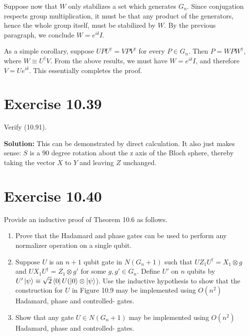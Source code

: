 \documentclass{book}
\begin{document}
    Suppose now that $W$ only stabilizes a set which generates $G_n$. Since conjugation respects group multiplication, it must be that any product of the generators, hence the whole group itself, must be stabilized by $W$. By the previous paragraph, we conclude $W = e^{i\delta} I $.
    
    As a simple corollary, suppose $U P U^\dagger = V P V^\dagger$ for every $P\in G_n$. Then $P = W P W^\dagger$, where $W \equiv U^\dagger V$. From the above results, we must have $W = e^{i\delta}I$, and therefore $V = U e^{i\delta}$. This essentially completes the proof.
    
\section*{Exercise 10.39}
    Verify (10.91).
    
    \textbf{Solution:} This can be demonstrated by direct calculation. It also just makes sense: $S$ is a 90 degree rotation about the z axis of the Bloch sphere, thereby taking the vector $X$ to $Y$ and leaving $Z$ unchanged. 
    
\section*{Exercise 10.40}
    Provide an inductive proof of Theorem 10.6 as follows.
    \begin{enumerate}
        \item Prove that the Hadamard and phase gates can be used to perform any normalizer operation on a single qubit.
    
        \item Suppose $U$ is an $n+1$ qubit gate in $N(G_n+1)$ such that $U Z_1 U^\dagger = X_1 \otimes g$ and $U X_1 U^\dagger = Z_1 \otimes g'$ for some $g,g' \in G_n$. Define $U'$ on $n$ qubits by $U'\ket{\psi} \equiv \sqrt{2}\bra{0} U (\ket{0} \otimes \ket{\psi}$). Use the inductive hypothesis to show that the construction for $U$ in Figure 10.9 may be implemented using $O(n^2)$ Hadamard, phase and controlled- gates.
    
        \item Show that any gate $U \in N(G_n+1)$ may be implemented using $O(n^2)$ Hadamard, phase and controlled- gates.
    \end{enumerate}
    
\end{document}
